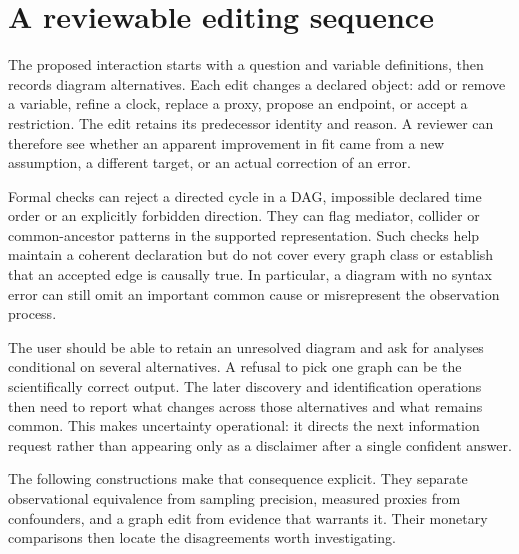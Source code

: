 \section{A reviewable editing sequence}

The proposed interaction starts with a question and variable definitions,
then records diagram alternatives. Each edit changes a declared object:
add or remove a variable, refine a clock, replace a proxy, propose an endpoint,
or accept a restriction. The edit retains its predecessor identity and
reason. A reviewer can therefore see whether an apparent improvement in
fit came from a new assumption, a different target, or an actual correction
of an error.

Formal checks can reject a directed cycle in a DAG, impossible declared
time order or an explicitly forbidden direction. They can flag mediator,
collider or common-ancestor patterns in the supported representation. Such
checks help maintain a coherent declaration but do not cover every graph
class or establish that an accepted edge is causally true. In particular,
a diagram with no syntax error can still omit an important common cause or
misrepresent the observation process.

The user should be able to retain an unresolved diagram and ask for analyses
conditional on several alternatives. A refusal to pick one graph can be the
scientifically correct output. The later discovery and identification
operations then need to report what changes across those alternatives and
what remains common. This makes uncertainty operational: it directs the
next information request rather than appearing only as a disclaimer after
a single confident answer.

The following constructions make that consequence explicit. They separate
observational equivalence from sampling precision, measured proxies from
confounders, and a graph edit from evidence that warrants it. Their monetary
comparisons then locate the disagreements worth investigating.
